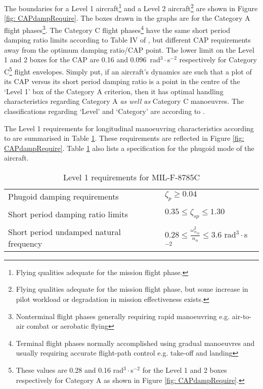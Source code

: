 \documentclass{report}
\begin{document}
The boundaries for a Level 1 aircraft\footnote{Flying qualities adequate for the mission flight phase.} and a Level 2 aircraft\footnote{Flying qualities adequate for the mission flight phase, but some increase in pilot work\-load or degradation in mission effectiveness exists.} are shown in Figure \ref{fig: CAPdampRequire}.  The boxes drawn in the graphs are for the Category A flight phases\footnote{Nonterminal flight phases generally requiring rapid manoeuvring e.g. air-to-air combat or aerobatic flying}.  The Category C flight phases\footnote{Terminal flight phases normally accomplished using gradual manoeuvres and usually requiring accurate flight-path control e.g. take-off and landing} have the same short period damping ratio limits according to Table IV of , but different CAP requirements away from the optimum damping ratio/CAP point.  The lower limit on the Level 1 and 2 boxes for the CAP are 0.16 and \mbox{0.096 rad$^3\cdot$s$^{-2}$} respectively for Category C\footnote{These values are 0.28 and 0.16 rad$^3\cdot$s$^{-2}$ for the Level 1 and 2 boxes respectively for Category A as shown in Figure \ref{fig: CAPdampRequire}.} flight envelopes.  Simply put, if an aircraft's dynamics are such that a plot of its CAP versus its short period damping ratio is a point in the centre of the `Level 1' box of the Category A criterion, then it has optimal handling characteristics regarding Category A \emph{as well as} Category C manoeuvres.  The classifications regarding `Level' and `Category' are according to \cite{MILF8785C}.



The Level 1 requirements for longitudinal manoeuvring characteristics according to  are summarised in Table \ref{tab:LevelIMIL-F-8785C}.  These requirements are reflected in Figure \ref{fig: CAPdampRequire}.  Table \ref{tab:LevelIMIL-F-8785C} also lists a specification for the phugoid mode of the aircraft.

\begin{table}[htb]
	\caption{Level 1 requirements for MIL-F-8785C}
	
	\begin{center}
		\begin{tabular}{l l}
			\hline
			Phugoid damping requirements & $ \zeta_{p} \geq 0.04 $ \\ \\
			Short period damping ratio limits & $ 0.35 \leq \zeta_{sp} \leq 1.30 $ \\ \\
			Short period undamped natural frequency & $ 0.28 \leq \frac{\omega_{n_{sp}}^2}{n_\alpha} \leq 3.6$ rad$^3\cdot$s$^{-2}$ \\
			\hline
		\end{tabular}
	\end{center}

	\label{tab:LevelIMIL-F-8785C}
\end{table}
\end{document}
